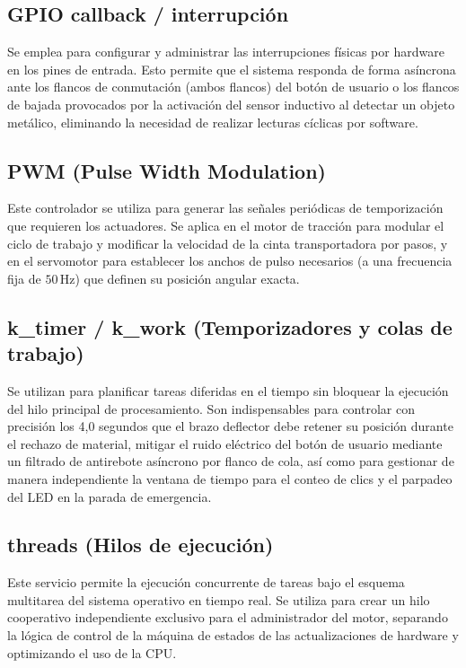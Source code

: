 \documentclass[12pt, letterpaper]{article}
\begin{document}
\subsection{GPIO callback / interrupción}
Se emplea para configurar y administrar las interrupciones físicas por hardware en los pines de entrada. Esto permite que el sistema responda de forma asíncrona ante los flancos de conmutación (ambos flancos) del botón de usuario o los flancos de bajada provocados por la activación del sensor inductivo al detectar un objeto metálico, eliminando la necesidad de realizar lecturas cíclicas por software.

\subsection{PWM (Pulse Width Modulation)}
Este controlador se utiliza para generar las señales periódicas de temporización que requieren los actuadores. Se aplica en el motor de tracción para modular el ciclo de trabajo y modificar la velocidad de la cinta transportadora por pasos, y en el servomotor para establecer los anchos de pulso necesarios (a una frecuencia fija de $50\,$Hz) que definen su posición angular exacta.

\subsection{k\_timer / k\_work (Temporizadores y colas de trabajo)}
Se utilizan para planificar tareas diferidas en el tiempo sin bloquear la ejecución del hilo principal de procesamiento. Son indispensables para controlar con precisión los 4,0 segundos que el brazo deflector debe retener su posición durante el rechazo de material, mitigar el ruido eléctrico del botón de usuario mediante un filtrado de antirebote asíncrono por flanco de cola, así como para gestionar de manera independiente la ventana de tiempo para el conteo de clics y el parpadeo del LED en la parada de emergencia.

\subsection{threads (Hilos de ejecución)}
Este servicio permite la ejecución concurrente de tareas bajo el esquema multitarea del sistema operativo en tiempo real. Se utiliza para crear un hilo cooperativo independiente exclusivo para el administrador del motor, separando la lógica de control de la máquina de estados de las actualizaciones de hardware y optimizando el uso de la CPU.
\end{document}
